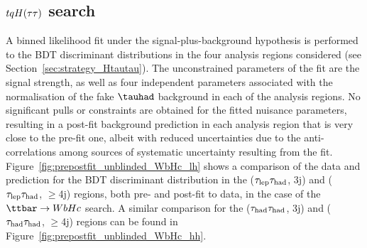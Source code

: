 %

\subsection{$tqH(\tau\tau)$ search}
\label{sec:results_Htautau}

A binned likelihood fit under the signal-plus-background hypothesis is performed to the BDT discriminant distributions in the four 
analysis regions considered (see Section~\ref{sec:strategy_Htautau}). The unconstrained parameters of the fit are the signal 
strength, as well as four independent parameters associated with the normalisation of the fake $\tauhad$ background in each of the analysis regions. 
No significant pulls or constraints are obtained for the fitted nuisance parameters, resulting in a post-fit background prediction in each analysis region that is
very close to the pre-fit one, albeit with reduced uncertainties due to the anti-correlations among sources of systematic uncertainty resulting from the fit.
Figure~\ref{fig:prepostfit_unblinded_WbHc_lh} shows a comparison of the data and prediction for the BDT discriminant distribution in
the ($\tau_{\mathrm{lep}} \tau_{\mathrm{had}}$, 3j) and ($\tau_{\mathrm{lep}} \tau_{\mathrm{had}}$, $\geq$4j) regions, both pre- and post-fit to data, in the case of the $\Hc$ search.  
A similar comparison for the ($\tau_{\mathrm{had}} \tau_{\mathrm{had}}$, 3j) and ($\tau_{\mathrm{had}} \tau_{\mathrm{had}}$, $\geq$4j) regions can be found in Figure~\ref{fig:prepostfit_unblinded_WbHc_hh}.

